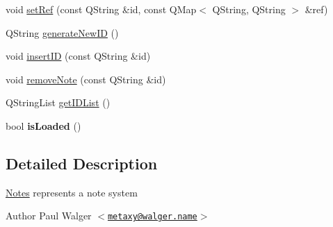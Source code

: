 \begin{DoxyCompactItemize}
void \hyperlink{classNotes_ad42175f40ec450badc4ed396229a3246}{setRef} (const QString \&id, const QMap$<$ QString, QString $>$ \&ref)
\item 
QString \hyperlink{classNotes_ab554798a22ce20a2f7cb195c3b1904bd}{generateNewID} ()
\item 
void \hyperlink{classNotes_a08ba874a751ba5fde4620ac5b5ff8037}{insertID} (const QString \&id)
\item 
void \hyperlink{classNotes_a86b09275d829523b0eb42da6b008a580}{removeNote} (const QString \&id)
\item 
QStringList \hyperlink{classNotes_aee2eb5a4a6cf347e38351585de15c013}{getIDList} ()
\item 
\hypertarget{classNotes_ab2acad06062836577b93e8ab64e5b1a8}{
bool {\bfseries isLoaded} ()}
\label{classNotes_ab2acad06062836577b93e8ab64e5b1a8}

\end{DoxyCompactItemize}


\subsection{Detailed Description}
\hyperlink{classNotes}{Notes} represents a note system

\begin{DoxyAuthor}{Author}
Paul Walger $<$\href{mailto:metaxy@walger.name}{\tt metaxy@walger.name}$>$ 
\end{DoxyAuthor}


